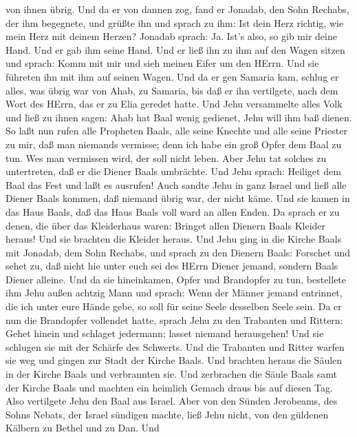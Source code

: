 von ihnen übrig.  Und da er von dannen zog, fand er
Jonadab, den Sohn Rechabs, der ihm begegnete, und grüßte ihn und sprach
zu ihm: Ist dein Herz richtig, wie mein Herz mit deinem Herzen? Jonadab
sprach: Ja. Ist's also, so gib mir deine Hand. Und er gab ihm seine
Hand. Und er ließ ihn zu ihm auf den Wagen sitzen  und
sprach: Komm mit mir und sieh meinen Eifer um den HErrn. Und sie
führeten ihn mit ihm auf seinen Wagen.  Und da er gen
Samaria kam, schlug er alles, was übrig war von Ahab, zu Samaria, bis
daß er ihn vertilgete, nach dem Wort des HErrn, das er zu Elia geredet
hatte.  Und Jehu versammelte alles Volk und ließ zu ihnen
sagen: Ahab hat Baal wenig gedienet, Jehu will ihm baß dienen.
 So laßt nun rufen alle Propheten Baals, alle seine Knechte
und alle seine Priester zu mir, daß man niemands vermisse; denn ich habe
ein groß Opfer dem Baal zu tun. Wes man vermissen wird, der soll nicht
leben. Aber Jehu tat solches zu untertreten, daß er die Diener Baals
umbrächte.  Und Jehu sprach: Heiliget dem Baal das Fest und
laßt es ausrufen!  Auch sandte Jehu in ganz Israel und ließ
alle Diener Baals kommen, daß niemand übrig war, der nicht käme. Und sie
kamen in das Haus Baals, daß das Haus Baals voll ward an allen Enden.
 Da sprach er zu denen, die über das Kleiderhaus waren:
Bringet allen Dienern Baals Kleider heraus! Und sie brachten die Kleider
heraus.  Und Jehu ging in die Kirche Baals mit Jonadab, dem
Sohn Rechabs, und sprach zu den Dienern Baals: Forschet und sehet zu,
daß nicht hie unter euch sei des HErrn Diener jemand, sondern Baals
Diener alleine.  Und da sie hineinkamen, Opfer und
Brandopfer zu tun, bestellete ihm Jehu außen achtzig Mann und sprach:
Wenn der Männer jemand entrinnet, die ich unter eure Hände gebe, so soll
für seine Seele desselben Seele sein.  Da er nun die
Brandopfer vollendet hatte, sprach Jehu zu den Trabanten und Rittern:
Gehet hinein und schlaget jedermann; lasset niemand herausgehen! Und sie
schlugen sie mit der Schärfe des Schwerts. Und die Trabanten und Ritter
warfen sie weg und gingen zur Stadt der Kirche Baals.  Und
brachten heraus die Säulen in der Kirche Baals und verbrannten sie.
 Und zerbrachen die Säule Baals samt der Kirche Baals und
machten ein heimlich Gemach draus bis auf diesen Tag.  Also
vertilgete Jehu den Baal aus Israel.  Aber von den Sünden
Jerobeams, des Sohns Nebats, der Israel sündigen machte, ließ Jehu
nicht, von den güldenen Kälbern zu Bethel und zu Dan.  Und
